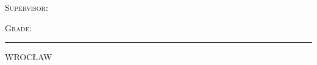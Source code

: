 \begin{center}
\begin{flushright}
\begin{minipage}[t]{10cm}
\begin{flushleft}
\begin{large}
					\vspace{1.5cm}
					\textsc{Supervisor:}\newline
					\prowadzacy\newline
					
					\vspace{0.5cm}
					\textsc{Grade:}\newline
				\end{large}
			\end{flushleft}
		\end{minipage}
	\end{flushright}
	\vfill
	\rule[-0.3ex]{\textwidth}{1pt}
	WROCŁAW \rok
\end{center}
\newpage
\clearpage
\enlargethispage{-3cm}
\addtolength{\textheight}{-1.8cm}
\addtolength{\textwidth}{-0.2cm}
\addtolength{\topmargin}{2.2cm}

